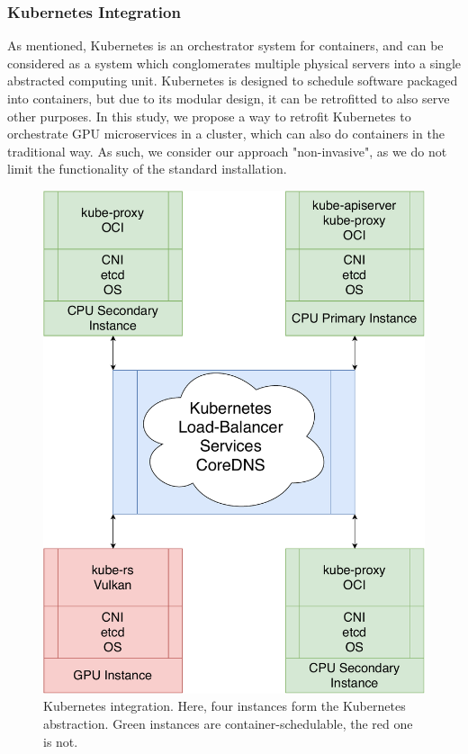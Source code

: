 \documentclass{IEEEtran}
\begin{document}
\subsubsection{Kubernetes Integration}
\label{ch:k8s}

As mentioned, Kubernetes \cite{burns2016borg} is an orchestrator system for containers, and can be considered as a system which conglomerates multiple physical servers into a single abstracted computing unit. Kubernetes is designed to schedule software packaged into containers, but due to its modular design, it can be retrofitted to also serve other purposes. In this study, we propose a way to retrofit Kubernetes to orchestrate GPU microservices in a cluster, which can also do containers in the traditional way. As such, we consider our approach "non-invasive", as we do not limit the functionality of the standard installation.

\begin{figure}
  \centering
  \includegraphics[width=\columnwidth]{k8s2.pdf}
  \caption{Kubernetes integration. Here, four instances form the Kubernetes abstraction. Green instances are container-schedulable, the red one is not.}
  \label{fig:k8s}
\end{figure}
\end{document}
